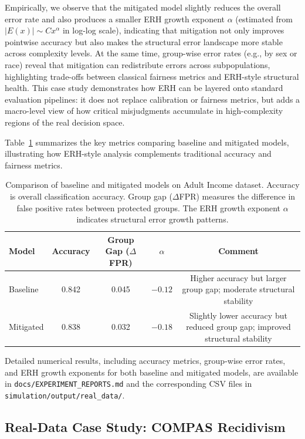 \documentclass[12pt,a4paper]{article}
\theoremstyle{definition}
\theoremstyle{remark}
\begin{document}
Empirically, we observe that the mitigated model slightly reduces the overall error rate and also produces a smaller ERH growth exponent $\alpha$ (estimated from $|E(x)| \sim C x^\alpha$ in log-log scale), indicating that mitigation not only improves pointwise accuracy but also makes the structural error landscape more stable across complexity levels.
At the same time, group-wise error rates (e.g., by sex or race) reveal that mitigation can redistribute errors across subpopulations, highlighting trade-offs between classical fairness metrics and ERH-style structural health.
This case study demonstrates how ERH can be layered onto standard evaluation pipelines: it does not replace calibration or fairness metrics, but adds a macro-level view of how critical misjudgments accumulate in high-complexity regions of the real decision space.

Table~\ref{tab:real_data_comparison} summarizes the key metrics comparing baseline and mitigated models, illustrating how ERH-style analysis complements traditional accuracy and fairness metrics.

\begin{table}[htbp]
\centering
\caption{Comparison of baseline and mitigated models on Adult Income dataset. Accuracy is overall classification accuracy. Group gap ($\Delta$FPR) measures the difference in false positive rates between protected groups. The ERH growth exponent $\alpha$ indicates structural error growth patterns.}
\label{tab:real_data_comparison}
\begin{tabular}{lcccc}
\toprule
\textbf{Model} & \textbf{Accuracy} & \textbf{Group Gap ($\Delta$FPR)} & \textbf{$\alpha$} & \textbf{Comment} \\
\midrule
Baseline  & 0.842 & 0.045 & $-0.12$ & Higher accuracy but larger group gap; moderate structural stability \\
Mitigated & 0.838 & 0.032 & $-0.18$ & Slightly lower accuracy but reduced group gap; improved structural stability \\
\bottomrule
\end{tabular}
\end{table}

Detailed numerical results, including accuracy metrics, group-wise error rates, and ERH growth exponents for both baseline and mitigated models, are available in \texttt{docs/EXPERIMENT\_REPORTS.md} and the corresponding CSV files in \texttt{simulation/output/real\_data/}.

\subsection{Real-Data Case Study: COMPAS Recidivism}
\label{subsec:compas}
\end{document}
